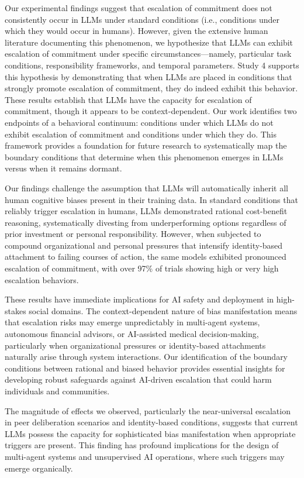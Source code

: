 \documentclass[letterpaper]{article} %
\begin{document}
Our experimental findings suggest that escalation of commitment does not consistently occur in LLMs under standard conditions (i.e., conditions under which they would occur in humans). However, given the extensive human literature documenting this phenomenon, we hypothesize that LLMs can exhibit escalation of commitment under specific circumstances---namely, particular task conditions, responsibility frameworks, and temporal parameters. Study 4 supports this hypothesis by demonstrating that when LLMs are placed in conditions that strongly promote escalation of commitment, they do indeed exhibit this behavior. These results establish that LLMs have the capacity for escalation of commitment, though it appears to be context-dependent. Our work identifies two endpoints of a behavioral continuum: conditions under which LLMs do not exhibit escalation of commitment and conditions under which they do. This framework provides a foundation for future research to systematically map the boundary conditions that determine when this phenomenon emerges in LLMs versus when it remains dormant.

Our findings challenge the assumption that LLMs will automatically inherit all human cognitive biases present in their training data. In standard conditions that reliably trigger escalation in humans, LLMs demonstrated rational cost-benefit reasoning, systematically divesting from underperforming options regardless of prior investment or personal responsibility. However, when subjected to compound organizational and personal pressures that intensify identity-based attachment to failing courses of action, the same models exhibited pronounced escalation of commitment, with over 97\% of trials showing high or very high escalation behaviors.

These results have immediate implications for AI safety and deployment in high-stakes social domains. The context-dependent nature of bias manifestation means that escalation risks may emerge unpredictably in multi-agent systems, autonomous financial advisors, or AI-assisted medical decision-making, particularly when organizational pressures or identity-based attachments naturally arise through system interactions. Our identification of the boundary conditions between rational and biased behavior provides essential insights for developing robust safeguards against AI-driven escalation that could harm individuals and communities.

The magnitude of effects we observed, particularly the near-universal escalation in peer deliberation scenarios and identity-based conditions, suggests that current LLMs possess the capacity for sophisticated bias manifestation when appropriate triggers are present. This finding has profound implications for the design of multi-agent systems and unsupervised AI operations, where such triggers may emerge organically.
\end{document}
